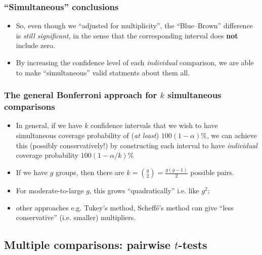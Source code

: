 \documentclass[a4paper]{article}\usepackage[]{graphicx}\usepackage[]{xcolor}
\begin{document}
\subsubsection{``Simultaneous'' conclusions}
\begin{itemize}
	\item So, even though we ``adjusted for multiplicity'', the ``Blue--Brown'' difference is \textit{still significant}, in the sense that the corresponding interval does \textbf{not} include zero.
	\item By increasing the confidence level of each \textit{individual} comparison, we are able to make ``simultaneous'' valid statments about them all.
\end{itemize}
\subsubsection{The general Bonferroni approach for \( k \) simultaneous comparisons}
\begin{itemize}
	\item In general, if we have \( k \)  confidence intervals that we wish to have simultaneous coverage probability of (\textit{at least}) \( 100(1-\alpha)\% \), we can achieve this (possibly conservatively!) by constructing each interval to have \textit{individual} coverage probability \( 100(1-\alpha/k)\% \)
	\item If we have \( g \) groups, then there are \( k = \binom{g}{2} = \frac{g(g-1)}{2} \) possible pairs.
	\item For moderate-to-large \( g \), this grows ``quadratically'' i.e. like \( g^2 \);
	\item other approaches e.g. Tukey's method, Scheffé's method can give ``less conservative'' (i.e. smaller) multipliers.
\end{itemize}
\subsection{Multiple comparisons: pairwise \( t \)-tests}
\end{document}
